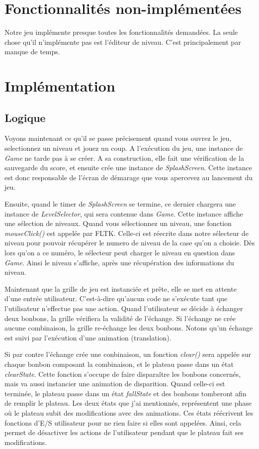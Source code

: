 \documentclass[11pt,a4paper]{article}
\begin{document}
\section{Fonctionnalités non-implémentées}
Notre jeu implémente presque toutes les fonctionnalités
demandées.
La seule chose qu'il n'implémente pas est l'éditeur de niveau.
C'est principalement par manque de temps.

\section{Implémentation}
\subsection{Logique}
Voyons maintenant ce qu'il se passe précisement quand vous ouvrez le jeu, selectionnez un 
niveau et jouez un coup. A l'exécution du jeu, une instance de \emph{Game} ne tarde pas à se créer. 
A sa construction, elle fait une vérification de la sauvegarde du score, et ensuite crée une 
instance de \emph{SplashScreen}. Cette instance est donc responsable 
de l'écran de démarage que vous apercevez au lancement du jeu.

Ensuite, quand le timer de \emph{SplashScreen} se termine, ce dernier chargera une instance 
de \emph{LevelSelector}, qui sera contenue dans \emph{Game}. Cette instance affiche une 
sélection de niveaux. Quand vous sélectionnez un niveau, une fonction \emph{mouseClick()} 
est appelée par FLTK. Celle-ci est réecrite dans notre sélecteur de niveau pour pouvoir récupérer 
le numero de niveau de la case qu'on a choisie. Dès lors qu'on a ce numéro, le sélecteur 
peut charger le niveau en question dans \emph{Game}. Ainsi le niveau s'affiche, après une 
récupération des informations du niveau.

Maintenant que la grille de jeu est instanciée et prête, elle se met en attente d'une entrée 
utilisateur. C'est-à-dire qu'aucun code ne s'exécute tant que l'utilisateur n'effectue pas une action.
Quand l'utilisateur se décide à échanger deux bonbons, la grille vérifiera la validité de l'échange.
Si l'échange ne crée aucune combinaison, la grille re-échange les deux bonbons. Notons qu'un échange 
est suivi par l'exécution d'une animation (translation). 

Si par contre l'échange crée une conbinaison, un fonction \emph{clear()} sera appelée sur chaque 
bonbon composant la combinaison, et le plateau passe dans un état \emph{clearState}. Cette fonction 
s'occupe de faire disparaître les bonbons concernés, mais va aussi instancier une animation de disparition. 
Quand celle-ci est terminée, le plateau passe dans un état \emph{fallState} et des bonbons tomberont afin 
de remplir le plateau. Les deux états que j'ai mentionnés, représentent une phase où le plateau subit des 
modifications avec des animations. Ces états réécrivent les fonctions d'E/S utilisateur pour ne rien faire 
si elles sont appelées. Ainsi, cela permet de désactiver les actions de l'utilisateur pendant que le plateau 
fait ses modifications.
\end{document}
